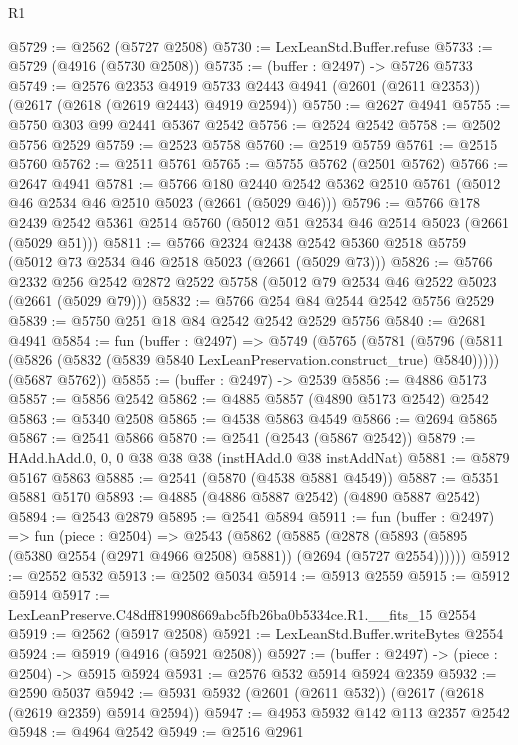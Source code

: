 \begin{lexlean}{R1}
\begin{coremodule}
@5729 := @2562 (@5727 @2508)
@5730 := LexLeanStd.Buffer.refuse
@5733 := @5729 (@4916 (@5730 @2508))
@5735 := (buffer : @2497) -> @5726 @5733
@5749 := @2576
    @2353
    @4919
    @5733
    @2443
    @4941
    (@2601 (@2611 @2353))
    (@2617 (@2618 (@2619 @2443) @4919 @2594))
@5750 := @2627 @4941
@5755 := @5750 @303 @99 @2441 @5367 @2542
@5756 := @2524 @2542
@5758 := @2502 @5756 @2529
@5759 := @2523 @5758
@5760 := @2519 @5759
@5761 := @2515 @5760
@5762 := @2511 @5761
@5765 := @5755 @5762 (@2501 @5762)
@5766 := @2647 @4941
@5781 := @5766
    @180
    @2440
    @2542
    @5362
    @2510
    @5761
    (@5012 @46 @2534 @46 @2510 @5023 (@2661 (@5029 @46)))
@5796 := @5766
    @178
    @2439
    @2542
    @5361
    @2514
    @5760
    (@5012 @51 @2534 @46 @2514 @5023 (@2661 (@5029 @51)))
@5811 := @5766
    @2324
    @2438
    @2542
    @5360
    @2518
    @5759
    (@5012 @73 @2534 @46 @2518 @5023 (@2661 (@5029 @73)))
@5826 := @5766
    @2332
    @256
    @2542
    @2872
    @2522
    @5758
    (@5012 @79 @2534 @46 @2522 @5023 (@2661 (@5029 @79)))
@5832 := @5766 @254 @84 @2544 @2542 @5756 @2529
@5839 := @5750 @251 @18 @84 @2542 @2542 @2529 @5756
@5840 := @2681 @4941
@5854 := fun (buffer : @2497) =>
  @5749
    (@5765
      (@5781 (@5796 (@5811 (@5826 (@5832 (@5839 @5840 LexLeanPreservation.construct_true) @5840)))))
      (@5687 @5762))
@5855 := (buffer : @2497) -> @2539
@5856 := @4886 @5173
@5857 := @5856 @2542
@5862 := @4885 @5857 (@4890 @5173 @2542) @2542
@5863 := @5340 @2508
@5865 := @4538 @5863 @4549
@5866 := @2694 @5865
@5867 := @2541 @5866
@5870 := @2541 (@2543 (@5867 @2542))
@5879 := HAdd.hAdd.{0, 0, 0} @38 @38 @38 (instHAdd.{0} @38 instAddNat)
@5881 := @5879 @5167 @5863
@5885 := @2541 (@5870 (@4538 @5881 @4549))
@5887 := @5351 @5881 @5170
@5893 := @4885 (@4886 @5887 @2542) (@4890 @5887 @2542)
@5894 := @2543 @2879
@5895 := @2541 @5894
@5911 := fun (buffer : @2497) =>
  fun (piece : @2504) =>
  @2543
    (@5862
      (@5885 (@2878 (@5893 (@5895 (@5380 @2554 (@2971 @4966 @2508) @5881)) (@2694 (@5727 @2554))))))
@5912 := @2552 @532
@5913 := @2502 @5034
@5914 := @5913 @2559
@5915 := @5912 @5914
@5917 := LexLeanPreserve.C48dff819908669abc5fb26ba0b5334ce.R1.__fits_15 @2554
@5919 := @2562 (@5917 @2508)
@5921 := LexLeanStd.Buffer.writeBytes @2554
@5924 := @5919 (@4916 (@5921 @2508))
@5927 := (buffer : @2497) -> (piece : @2504) -> @5915 @5924
@5931 := @2576 @532 @5914 @5924 @2359
@5932 := @2590 @5037
@5942 := @5931 @5932 (@2601 (@2611 @532)) (@2617 (@2618 (@2619 @2359) @5914 @2594))
@5947 := @4953 @5932 @142 @113 @2357 @2542
@5948 := @4964 @2542
@5949 := @2516 @2961

\end{coremodule}
\end{lexlean}

